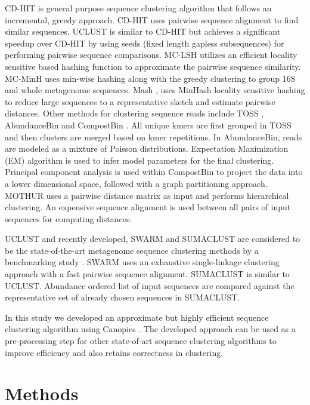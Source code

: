 \documentclass[10pt, conference, compsocconf]{IEEEtran}
\begin{document}
CD-HIT \cite{MARCDhit} is general purpose sequence clustering algorithm that follows an incremental, greedy approach. CD-HIT uses pairwise sequence alignment to find similar sequences. UCLUST \cite{MARuclust} is similar to CD-HIT but achieves a significant speedup over CD-HIT by using seeds (fixed length gapless subsequences) for performing pairwise sequence comparisons. MC-LSH \cite{MARMetaLSH} utilizes an efficient locality sensitive based hashing function to approximate the pairwise sequence similarity. MC-MinH \cite{MARMcMinH} uses min-wise \cite{MARMinWise} hashing along with the greedy clustering to group 16S and whole metagenome sequences. Mash \cite{MAROtherMinH}, uses MinHash locality sensitive hashing to reduce large sequences to a representative sketch and estimate pairwise distances. Other methods for clustering sequence reads include TOSS \cite{MARToss}, AbundanceBin \cite{MARAbundant} and CompostBin \cite{MARCompost}. All unique kmers are first grouped in TOSS and then clusters are merged based on kmer repetitions. In AbundanceBin, reads are modeled as a mixture of Poisson distributions. Expectation Maximization (EM) algorithm is used to infer model parameters for the final clustering. Principal component analysis is used within CompostBin to project the data into a lower dimensional space, followed with a graph partitioning approach. MOTHUR \cite{MARMothur} uses a pairwise distance matrix as input and performs hierarchical clustering. An expensive sequence alignment is used between all pairs of input sequences for computing distances.

UCLUST \cite{MARuclust} and recently developed, SWARM \cite{MARSwarm2} and SUMACLUST \cite{MARSumaclust}  are considered to be the state-of-the-art metagenome sequence clustering methods by a benchmarking study \cite{MARDeNovo}. SWARM uses an  exhaustive single-linkage clustering approach with a fast pairwise sequence alignment. SUMACLUST is similar to UCLUST. Abundance ordered list of input sequences are compared against the representative set of already chosen sequences in SUMACLUST. 

In this study we developed an approximate but highly efficient sequence clustering algorithm  using Canopies \cite{MARCanopy}. The developed approach can be used as a pre-processing step for other state-of-art sequence clustering algorithms to improve efficiency and also retains correctness in clustering.

\section{Methods}
\label{sec:Methods}
\end{document}
